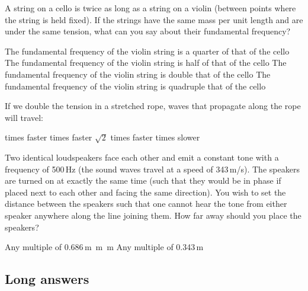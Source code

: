 \question A string on a cello is twice as long as a string on a violin (between points where the string is held fixed). If the strings have the same mass per unit length and are under the same tension, what can you say about their fundamental frequency?
\begin{choices} 
\choice The fundamental frequency of the violin string is a quarter of that of the cello
\choice The fundamental frequency of the violin string is half of that of the cello
\CorrectChoice The fundamental frequency of the violin string is double that of the cello \correct
\choice The fundamental frequency of the violin string is quadruple that of the cello
\end{choices}

\question If we double the tension in a stretched rope, waves that propagate along the rope will travel:
\begin{checkboxes}
 times faster
 times faster
\CorrectChoice $\sqrt{2}$ times faster \correct
{} times slower
\end{checkboxes}

\question Two identical loudspeakers face each other and emit a constant tone with a frequency of 500\,Hz (the sound waves travel at a speed of 343\,m/s). The speakers are turned on at exactly the same time (such that they would be in phase if placed next to each other and facing the same direction).  You wish to set the distance between the speakers such that one cannot hear the tone from either speaker anywhere along the line joining them. How far away should you place the speakers?
\begin{checkboxes}
\CorrectChoice Any multiple of 0.686\,m \correct
{}\,m
\,m
\choice Any multiple of 0.343\,m
\end{checkboxes}
\newpage 

%
%
\subsection{Long answers}

